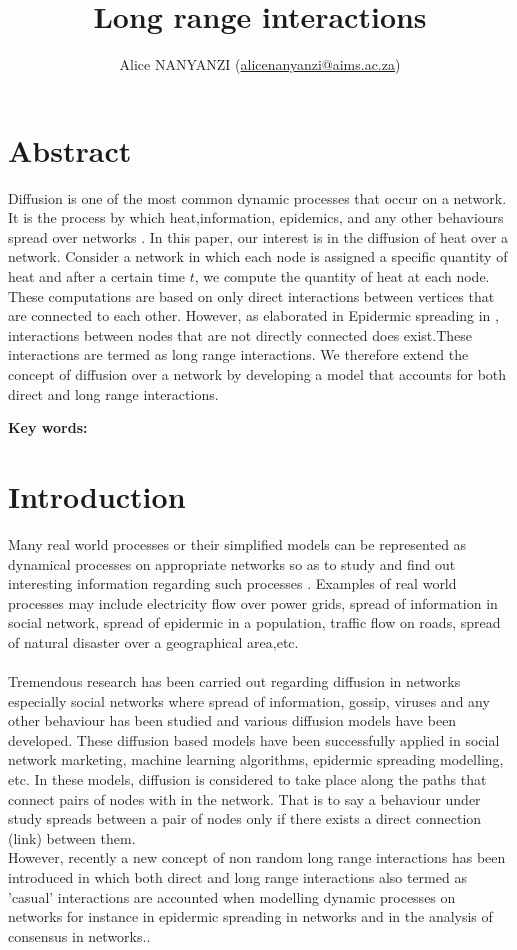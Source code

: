 \documentclass[10pt,a4paper]{article}
\author{Alice NANYANZI (\href{mailto:alicenanyanzi@aims.ac.za}{alicenanyanzi@aims.ac.za})}
\title{Long range interactions}
\begin{document}
\maketitle
\section{Abstract}
Diffusion is one of the most common dynamic processes that occur on a network. It is the process by which  heat,information, epidemics, and any other behaviours spread over networks \cite{kasprzak2012diffusion}. In this paper, our interest is in the diffusion of heat over a network. Consider a network in which each node is assigned a specific quantity of heat and after a certain time $t$, we compute the quantity of heat at each node. These computations are based on only direct interactions between vertices that are connected to each other. However, as elaborated in Epidermic spreading in \cite{estrada2011epidemic}, interactions between nodes that are not directly connected does exist.These interactions are termed as long range interactions. We therefore extend the concept of diffusion over a network by developing a model that accounts for both direct and long range interactions.

\textbf{Key words: }

\section{Introduction}
Many real world processes or their simplified models can be represented as dynamical processes on appropriate networks so as to study and find out interesting information regarding such processes \cite{newman2010networks}. Examples of real world processes may include electricity flow over power grids, spread of information in social network, spread of epidermic in a population, traffic flow on roads, spread of natural disaster over a geographical area,etc. \\\\
Tremendous research has been carried out regarding diffusion in networks especially social networks where spread of information, gossip, viruses and any other behaviour has been studied and various diffusion models have been developed. These diffusion based models have been successfully applied in social network marketing, machine learning algorithms, epidermic spreading modelling,  etc.  \cite{kasprzak2012diffusion,estrada2011epidemic} In these models, diffusion is considered to take place along the paths that connect pairs of nodes with in the network.
That is to say a behaviour under study spreads between a pair of nodes only if there exists a direct connection (link) between them. \\
However, recently a new concept of non random long range interactions has been introduced in which both direct and long range interactions also termed as 'casual' interactions are accounted when modelling dynamic processes on networks for instance in epidermic spreading in networks and in the analysis of consensus in networks.\cite{estrada2011epidemic,estrada-consesus}.
\end{document}
